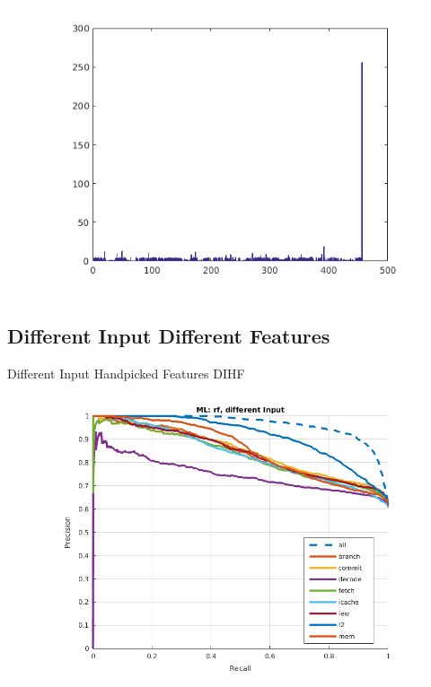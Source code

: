 \documentclass{sig-alternate}
\begin{document}
\begin{figure}[t]
\begin{center}
   \includegraphics[width=0.95\linewidth]{./figures/feat_diff.png}
\end{center}
   \caption{}
\label{fig:feat-diff}
\end{figure}

\subsection{Different Input Different Features}
Different Input Handpicked Features DIHF

\begin{figure}[t]
\begin{center}
   \includegraphics[width=0.95\linewidth]{./figures/didf.png}
\end{center}
   \caption{}
\label{fig:didf}
\end{figure}
\end{document}
